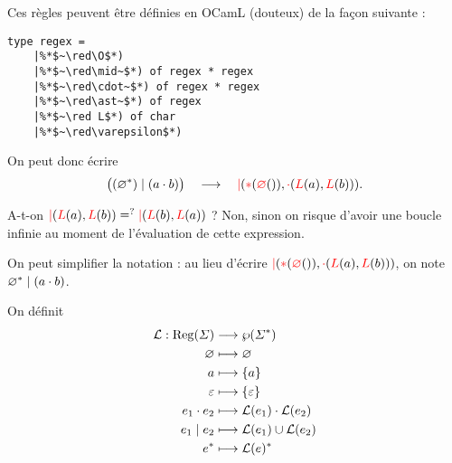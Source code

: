 Ces règles peuvent être définies en OCamL (douteux) de la façon suivante :
\begin{lstlisting}[language=caml, caption=Règles des expressions régulières en OCamL]
type regex =
	|%*$~\red\O$*)
	|%*$~\red\mid~$*) of regex * regex
	|%*$~\red\cdot~$*) of regex * regex
	|%*$~\red\ast~$*) of regex
	|%*$~\red L$*) of char
	|%*$~\red\varepsilon$*)
\end{lstlisting}
\noindent On peut donc écrire \[
	\big((\varnothing^*) \mid (a\cdot b) \big) \quad \longrightarrow\quad {\color{red}|}({\color{red}*}({\color{red}\varnothing}()), {\color{red}\cdot}({\color{red}L}(a),{\color{red}L}(b)))
.\]

A-t-on ${\color{red}|}({\color{red}L}(a), {\color{red}L}(b)) \mathrel{\mathop=^?} {\color{red}|}({\color{red}L}(b), {\color{red}L}(a))$\/ ? Non, sinon on risque d'avoir une boucle infinie au moment de l'évaluation de cette expression.

On peut simplifier la notation : au lieu d'écrire ${\color{red}|}({\color{red}*}({\color{red}\varnothing}()), {\color{red}\cdot}({\color{red}L}(a),{\color{red}L}(b)))$, on note $\varnothing^* \mid (a\cdot b)$.

\begin{defn}
	On définit \begin{align*}
		\mathcal{L}: \operatorname{Reg}(\varSigma) &\longrightarrow \wp(\varSigma^*) \\
		\varnothing &\longmapsto \varnothing\\
		a &\longmapsto \{a\}\\
		\varepsilon &\longmapsto \{\varepsilon\}\\
		e_1\cdot e_2 &\longmapsto \mathcal{L}(e_1) \cdot  \mathcal{L}(e_2)\\
		e_1 \mid e_2 &\longmapsto \mathcal{L}(e_1) \cup \mathcal{L}(e_2)\\
		e^* &\longmapsto \mathcal{L}(e)^*\\
	\end{align*}
\end{defn}

